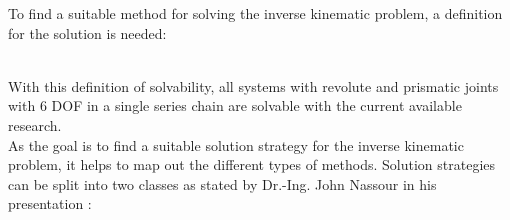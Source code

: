To find a suitable method for solving the inverse kinematic problem, a definition for the solution is needed:\\
\medskip
\\
\bigskip

With this definition of solvability, all systems with revolute and prismatic joints with 6 \ac{DOF}  in a single series chain are solvable with the current available research. \cite{invKinSeriallinkMani}
\\

As the goal is to find a suitable solution strategy for the inverse kinematic problem, it helps to map out the different types of methods.
Solution strategies can be split into two classes as stated by Dr.-Ing. John Nassour in his presentation \cite{invKinSeriallinkMani}:\\
\medskip


